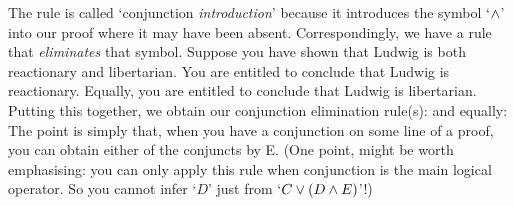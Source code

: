 The rule is called `conjunction \emph{introduction}' because it introduces the symbol `$\wedge$' into our proof where it may have been absent. Correspondingly, we have a rule that \emph{eliminates} that symbol.  Suppose you have shown that Ludwig is both reactionary and libertarian. You are entitled to conclude that Ludwig is reactionary. Equally, you are entitled to conclude that Ludwig is libertarian. Putting this together, we obtain our conjunction elimination rule(s):
and equally:
The point is simply that, when you have a conjunction on some line of a proof, you can obtain either of the conjuncts by {\eand}E. (One point, might be worth emphasising: you can only apply this rule when conjunction is the main logical operator. So you cannot infer `$D$' just from `$C \vee (D \wedge E)$'!)


